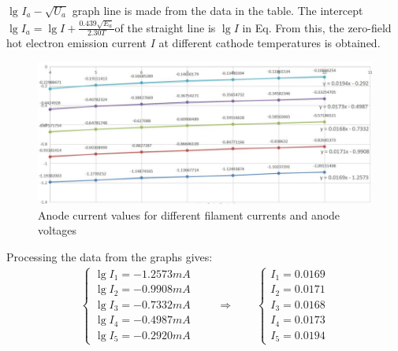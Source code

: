 \documentclass[UTF8]{article}
\begin{document}
$\lg_{}{I_a}-\sqrt{U_a}$ graph line is made from the data in the table. The intercept $\lg{I_a}=\lg{I}+\frac{0.439\sqrt{E_a} }{2.30T}  $of the straight line is $\lg{I}$ in Eq. From this, the zero-field hot electron emission current $I$ at different cathode temperatures is obtained.
\begin{figure}[H]
            	\centering
            	\includegraphics[clip,scale=1,trim={0 0 0 0}]{fig/fig14.png}
            	\caption{Anode current values for different filament currents and anode voltages}
            	\label{figure.14}
\end{figure}
Processing the data from the graphs gives:
\begin{eqnarray}
\begin{cases}
 \lg I_1 = -1.2573mA\\
 \lg I_2 = -0.9908mA\\
 \lg I_3 = -0.7332mA\\
 \lg I_4 = -0.4987mA\\
 \lg I_5 = -0.2920mA
\end{cases}\qquad \Longrightarrow \qquad \begin{cases}
 I_1=0.0169\\
 I_2=0.0171\\
 I_3=0.0168\\
 I_4=0.0173\\
 I_5=0.0194
\end{cases}
\end{eqnarray}
\end{document}
